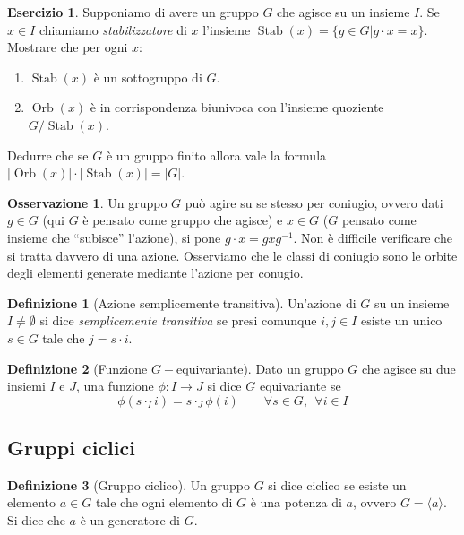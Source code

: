 \documentclass[11pt]{article}
\theoremstyle{plain}
\theoremstyle{definition}
\newtheorem{defn}{Definizione}[section]
\newtheorem{exercise}{Esercizio}[section]
\newtheorem*{rem}{Osservazione}
\theoremstyle{remark}
\DeclareMathOperator{\Orb}{Orb}
\DeclareMathOperator{\Stab}{Stab}
\begin{document}
\begin{exercise}
Supponiamo di avere un gruppo $G$ che agisce su un insieme $I$. Se $x\in I$ chiamiamo \emph{stabilizzatore} di $x$ l'insieme
$\Stab(x) = \{g\in G| g\cdot x = x\}$.
Mostrare che per ogni $x$:
\begin{enumerate}
\item $\Stab(x)$ è un sottogruppo di $G$.
\item $\Orb(x)$ è in corrispondenza biunivoca con l'insieme quoziente $G/\Stab(x)$.
\end{enumerate}
Dedurre che se $G$ è un gruppo finito allora vale la formula $|\Orb(x)| \cdot |\Stab(x)| = |G|$.
\end{exercise}



\begin{rem}
	Un gruppo $G$ può agire su se stesso per coniugio, ovvero dati $g\in G$ (qui $G$ è pensato come gruppo che agisce) e $x\in G$ ($G$ pensato come insieme che ``subisce'' l'azione),
	si pone $g\cdot x = gxg^{-1}$. Non è difficile verificare che si tratta davvero di una azione.
	Osserviamo che le classi di coniugio sono le orbite degli elementi generate mediante l'azione per conugio.
\end{rem}




\begin{defn}[Azione semplicemente transitiva]
Un'azione di $G$ su un insieme $I\neq \emptyset$ si dice \emph{semplicemente transitiva}
se presi comunque $i,j\in I$ esiste un unico $s\in G$ tale che $j=s\cdot i$.
\end{defn}


\begin{defn}[Funzione $G-$equivariante]
Dato un gruppo $G$ che agisce su due insiemi $I$ e $J$, una funzione $\phi: I \to J$ si dice $G$ equivariante se
\[ \phi(s \cdot_I i) = s \cdot_J \phi(i) \qquad \forall s \in G, \ \ \forall i \in I \]
\end{defn}





\newpage
\subsection{Gruppi ciclici}

\begin{defn}[Gruppo ciclico] Un gruppo $G$ si dice ciclico se esiste un elemento $a\in G$ tale che ogni
elemento di $G$ è una potenza di $a$, ovvero $G=\langle a\rangle$. Si dice che $a$ è un generatore di $G$.
\end{defn}
\end{document}
